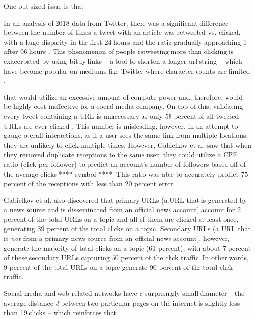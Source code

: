 One out-sized issue is that 


In an analysis of 2018 data from Twitter, there was a significant difference between the number of times a tweet with an article was retweeted vs. clicked, with a huge disparity in the first 24 hours and the ratio gradually approaching 1 after 96 hours \citep{holmstrom2019we}. This phenomenon of people retweeting more than clicking is exacerbated by using bit.ly links -- a tool to shorten a longer url string -- which have become popular on mediums like Twitter where character counts are limited \citep{mostrom2020longitudinal}.





that would utilize an excessive amount of compute power and, therefore, would be highly cost ineffective for a social media company. On top of this, validating every tweet containing a URL is unnecessary as only 59 percent of all tweeted URLs are ever clicked \citep{gabielkov2016social}. This number is misleading, however, in an attempt to gauge overall interactions, as if a user sees the same link from multiple locations, they are unlikely to click multiple times. However, Gabielkov et al. saw that when they removed duplicate receptions to the same user, they could utilize a CPF ratio (click-per-follower) to predict an account's number of followers based off of the average clicks **** symbol ****. This ratio was able to accurately predict 75 percent of the receptions with less than 20 percent error. 

Gabielkov et al. also discovered that primary URLs (a URL that is generated by a news source and is disseminated from an official news account) account for 2 percent of the total URLs on a topic and all of them are clicked at least once, generating 39 percent of the total clicks on a topic. Secondary URLs (a URL that is \textit{not} from a primary news source from an official news account), however, generate the majority of total clicks on a topic (61 percent), with about 7 percent of these secondary URLs capturing 50 percent of the click traffic. In other words, 9 percent of the total URLs on a topic generate 90 percent of the total click traffic.


Social media and web related networks have a surprisingly small diameter -- the average distance \textit{d} between two particular pages on the internet is slightly less than 19 clicks \citep{albert1999diameter} -- which reinforces that 




